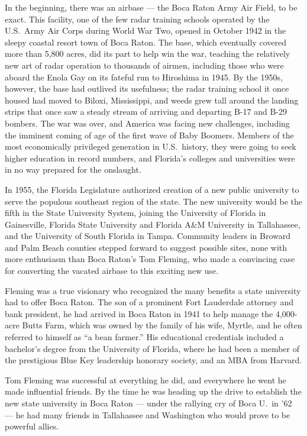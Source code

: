 \documentclass{article}
\begin{document}
In the beginning, there was an airbase  ---  the Boca Raton Army Air Field, to be exact.  This facility, one of the few radar training schools operated by the U.S.\ Army Air Corps during World War Two, opened in October 1942 in the sleepy coastal resort town of Boca Raton.  The base, which eventually covered more than 5,800 acres, did its part to help win the war, teaching the relatively new art of radar operation to thousands of airmen, including those who were aboard the Enola Gay on its fateful run to Hiroshima in 1945.  By the 1950s, however, the base had outlived its usefulness; the radar training school it once housed had moved to Biloxi, Mississippi, and weeds grew tall around the landing strips that once saw a steady stream of arriving and departing B-17 and B-29 bombers.  The war was over, and America was facing new challenges, including the imminent coming of age of the first wave of Baby Boomers.  Members of the most economically privileged generation in U.S.\ history, they were going to seek higher education in record numbers, and Florida's colleges and universities were in no way prepared for the onslaught.

In 1955, the Florida Legislature authorized creation of a new public university to serve the populous southeast region of the state.  The new university would be the fifth in the State University System, joining the University of Florida in Gainesville, Florida State University and Florida A\&M University in Tallahassee, and the University of South Florida in Tampa. Community leaders in Broward and Palm Beach counties stepped forward to suggest possible sites, none with more enthusiasm than Boca Raton's Tom Fleming, who made a convincing case for converting the vacated airbase to this exciting new use.

Fleming was a true visionary who recognized the many benefits a state university had to offer Boca Raton.  The son of a prominent Fort Lauderdale attorney and bank president, he had arrived in Boca Raton in 1941 to help manage the 4,000-acre Butts Farm, which was owned by the family of his wife, Myrtle, and he often referred to himself as ``a bean farmer.''  His educational credentials included a bachelor's degree from the University of Florida, where he had been a member of the prestigious Blue Key leadership honorary society, and an MBA from Harvard.

Tom Fleming was successful at everything he did, and everywhere he went he made influential friends.  By the time he was heading up the drive to establish the new state university in Boca Raton  ---  under the rallying cry of  Boca U.\ in '62   ---  he had many friends in Tallahassee and Washington who would prove to be powerful allies.
\end{document}
